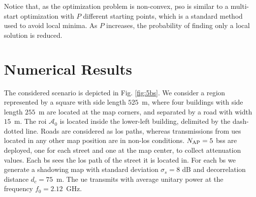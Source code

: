 \documentclass[conference,final]{IEEEtran}
\begin{document}


      
    

Notice that, as the optimization problem is non-convex,  \ac{pso} is similar to a multi-start optimization with $P$ different starting points, which is a standard method used to avoid local minima. As  $P$ increases, the probability of finding only   a local solution is reduced.

\section{Numerical Results}\label{sec: nr}

The considered scenario is depicted in Fig. \ref{fig:5bs}. 
We consider a region  represented by a square with side length $525$~m, where four buildings with side length $255$~m are located at the map corners, and separated by a road with width $15$~m. The \ac{roi} $\mathcal{A}_0$ is located inside the lower-left building, delimited by the dash-dotted line. Roads are considered as \ac{los} paths, whereas transmissions from \acp{ue} located in any other map position are in non-\ac{los} conditions. $N_{\rm AP}=5$ \acp{bs} are deployed, one for each street and one at the map center, to collect attenuation values. Each \ac{bs} sees the \ac{los} path of the street it is located in. For each \ac{bs} we generate a shadowing map with standard deviation $\sigma_s = 8$ dB and decorrelation distance $d_c = 75$~m. The \ac{ue} transmits with average unitary power at the frequency $f_0 = 2.12$~GHz.
\end{document}
